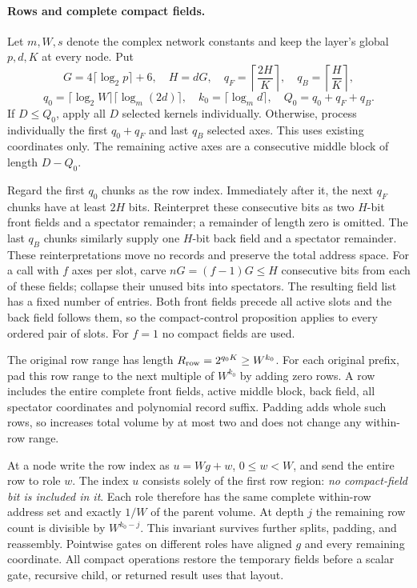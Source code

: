 \paragraph{Rows and complete compact fields.}
Let $m,W,s$ denote the complex network constants and keep the layer's global
$p,d,K$ at every node. Put
\[
 G=4\lceil\log_2p\rceil+6,\quad H=dG,\quad
 q_F=\left\lceil\frac{2H}{K}\right\rceil,\quad
 q_B=\left\lceil\frac{H}{K}\right\rceil,
\]
\[
 q_0=\lceil\log_2W\rceil\lceil\log_m(2d)\rceil,
 \quad k_0=\lceil\log_m d\rceil,\quad Q_0=q_0+q_F+q_B.
\]
If $D\le Q_0$, apply all $D$ selected kernels individually. Otherwise,
process individually the first $q_0+q_F$ and last $q_B$ selected axes.
This uses existing coordinates only. The remaining active axes are a
consecutive middle block of length $D-Q_0$.

Regard the first $q_0$ chunks as the row index. Immediately after it, the
next $q_F$ chunks have at least $2H$ bits. Reinterpret these consecutive
bits as two $H$-bit front fields and a spectator remainder; a remainder
of length zero is omitted. The last $q_B$ chunks similarly supply one
$H$-bit back field and a spectator remainder. These reinterpretations move
no records and preserve the total address space. For a call with $f$ axes
per slot, carve $nG=(f-1)G\le H$ consecutive bits from each of these
fields; collapse their unused bits into spectators. The resulting field
list has a fixed number of entries. Both front fields precede all active
slots and the back field follows them, so the compact-control proposition
applies to every ordered pair of slots. For $f=1$ no compact fields are used.

The original row range has length $R_{\rm row}=2^{q_0K}\ge W^{k_0}$.
For each original prefix, pad this row range to the next multiple of
$W^{k_0}$ by adding zero rows. A row includes the entire complete front
fields, active middle block, back field, all spectator coordinates and
polynomial record suffix. Padding adds whole such rows, so increases total
volume by at most two and does not change any within-row range.

At a node write the row index as $u=Wg+w$, $0\le w<W$, and send the entire
row to role $w$. The index $u$ consists solely of the first row region:
\emph{no compact-field bit is included in it}. Each role therefore has
the same complete within-row address set and exactly $1/W$ of the parent
volume. At depth $j$ the remaining row count is divisible by $W^{k_0-j}$.
This invariant survives further splits, padding, and reassembly. Pointwise
gates on different roles have aligned $g$ and every remaining coordinate.
All compact operations restore the temporary fields before a scalar gate,
recursive child, or returned result uses that layout.

